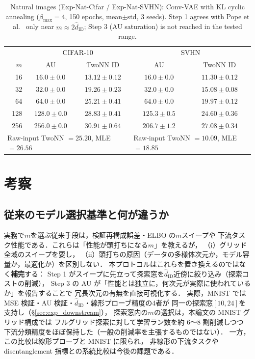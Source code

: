 \documentclass[11pt,a4paper]{jsarticle}
\newcommand{\hatdID}{\hat{d}_{\mathrm{ID}}}
\begin{document}
\begin{table}[H]
\centering
\caption{Natural images (Exp-Nat-Cifar / Exp-Nat-SVHN): Conv-VAE with KL
cyclic annealing ($\beta_{\max} = 4$, 150 epochs, mean$\pm$std, 3 seeds).
Step 1 agrees with Pope et al.~\cite{pope2021intrinsic} only near
$m \approx 2\hatdID$; Step 3 (AU saturation) is not reached in the tested
range.}
\label{tab:natural}
\small
\begin{tabular}{r cc | cc}
\toprule
 & \multicolumn{2}{c|}{CIFAR-10} & \multicolumn{2}{c}{SVHN} \\
$m$ & AU & TwoNN ID & AU & TwoNN ID \\
\midrule
 16 & $16.0 \pm 0.0$ & $13.12 \pm 0.12$ & $16.0 \pm 0.0$ & $11.30 \pm 0.12$ \\
 32 & $32.0 \pm 0.0$ & $19.26 \pm 0.23$ & $32.0 \pm 0.0$ & $15.08 \pm 0.08$ \\
 64 & $64.0 \pm 0.0$ & $\mathbf{25.21 \pm 0.41}$ & $64.0 \pm 0.0$ & $19.97 \pm 0.12$ \\
128 & $128.0 \pm 0.0$ & $28.83 \pm 0.41$ & $125.3 \pm 0.5$ & $24.60 \pm 0.36$ \\
256 & $256.0 \pm 0.0$ & $30.91 \pm 0.64$ & $206.7 \pm 1.2$ & $27.08 \pm 0.34$ \\
\midrule
\multicolumn{3}{l|}{Raw-input TwoNN $= 25.20$, MLE $= 26.56$} &
\multicolumn{2}{l}{Raw-input TwoNN $= 10.09$, MLE $= 18.85$} \\
\bottomrule
\end{tabular}
\end{table}

\section{考察}\label{sec:discussion}

\subsection{従来のモデル選択基準と何が違うか}\label{sec:disc_model_selection}

実務で$m$を選ぶ従来手段は，検証再構成誤差・ELBO の$m$スイープや
下流タスク性能である．これらは「性能が頭打ちになる$m$」を教えるが，
（i）グリッド全域のスイープを要し，
（ii）頭打ちの原因（データの多様体次元か，モデル容量か，最適化か）を区別しない．
本プロトコルはこれらを置き換えるのではなく\textbf{補完}する：
Step 1 がスイープに先立って探索窓を$\hatdID$近傍に絞り込み（探索コストの削減），
Step 3 の AU が「性能とは独立に，何次元が実際に使われているか」を報告することで
冗長次元の有無を直接可視化する．
実際，MNIST では MSE 検証・AU 検証・$\hatdID$・線形プローブ精度の4者が
同一の探索窓$[10, 24]$を支持し（§\ref{sec:exp_downstream}），
探索窓内の$m$の選択は，本論文の MNIST グリッド構成では
フルグリッド探索に対して学習ラン数を約 6〜8 割削減しつつ
下流分類精度をほぼ保持した（一般の削減率を主張するものではない）．
一方，この比較は線形プローブと MNIST に限られ，
非線形の下流タスクや disentanglement 指標との系統比較は今後の課題である．
\end{document}
